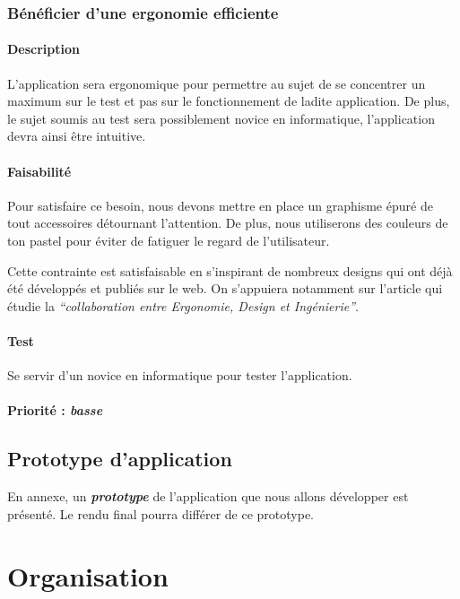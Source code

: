 \documentclass[a4paper,twoside,10pt]{report}
\begin{document}
\subsection{Bénéficier d’une ergonomie efficiente}

\subsubsection{Description}

L’application sera ergonomique pour permettre au sujet de se concentrer un maximum sur le test et pas sur le fonctionnement de ladite application. De plus, le sujet soumis au test sera possiblement novice en informatique, l’application devra ainsi être intuitive.

\subsubsection{Faisabilité}

Pour satisfaire ce besoin, nous devons mettre en place un graphisme épuré de tout accessoires détournant l’attention. De plus, nous utiliserons des couleurs de ton pastel pour éviter de fatiguer le regard de l’utilisateur.

Cette contrainte est satisfaisable en s’inspirant de nombreux designs qui ont déjà été développés et publiés sur le web. On s’appuiera notamment sur l’article \cite{lente2014scenariser} qui étudie la \textit{“collaboration entre Ergonomie, Design et Ingénierie”}.

\subsubsection{Test}

Se servir d'un novice en informatique pour tester l’application.

\subsubsection{Priorité : \textit{basse}}

\section{Prototype d'application}

  En annexe, un \textbf{\textit{prototype}} de l'application que nous allons développer est présenté. Le rendu final pourra différer de ce prototype.


\chapter{Organisation}
\end{document}
